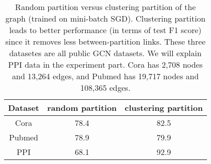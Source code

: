 \documentclass[sigconf]{acmart}
\begin{document}
\begin{table}
\caption{Random partition versus clustering partition of the graph (trained on mini-batch SGD). Clustering partition leads to better performance (in terms of test F1 score) since it removes less between-partition links. These three datasetes are all public GCN datasets. We will explain PPI data in the experiment part. Cora has 2,708 nodes and 13,264 edges, and Pubmed has 19,717 nodes and 108,365 edges. }
  \centering
  \renewcommand\bfdefault{b}
  \vspace{-10pt}\begin{tabular}{|c|c|c|}
  \hline
   Dataset &  random partition  & clustering partition \\
  \hline
  Cora &  78.4 & 82.5 \\
  \hline
  Pubmed &  78.9  & 79.9 \\
  \hline
  PPI &   68.1 & 92.9\\
\hline
\end{tabular}
\label{tab:random}
\vspace{-10pt}
\end{table}
\end{document}
